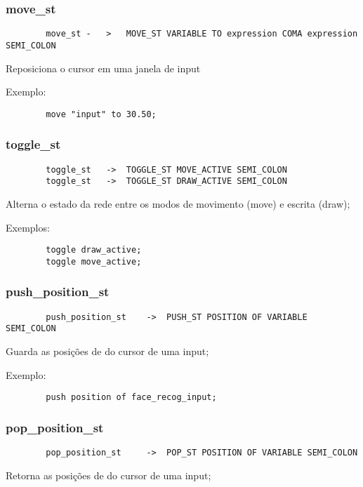 \documentclass[a4paper,10pt]{article}
\begin{document}
	\subsubsection{move\_st}
		\begin{lstlisting}
		move_st	-	>	MOVE_ST VARIABLE TO expression COMA expression SEMI_COLON
		\end{lstlisting}
		Reposiciona o cursor em uma janela de input
		
		Exemplo:
		\begin{lstlisting}
		move "input" to 30.50;
		\end{lstlisting}
		\vspace{10mm}
	\subsubsection{toggle\_st}
		\begin{lstlisting}
		toggle_st	->	TOGGLE_ST MOVE_ACTIVE SEMI_COLON
		toggle_st	->	TOGGLE_ST DRAW_ACTIVE SEMI_COLON
		\end{lstlisting}
		Alterna o estado da rede entre os modos de movimento (move) e escrita (draw);
		
		Exemplos:
		\begin{lstlisting}
		toggle draw_active;
		toggle move_active;
		\end{lstlisting}
		\vspace{10mm}
	\subsubsection{push\_position\_st}
		\begin{lstlisting}
		push_position_st	->	PUSH_ST POSITION OF VARIABLE SEMI_COLON
		\end{lstlisting}
		Guarda as posi\c{c}\~oes de do cursor de uma input;
		
		Exemplo:
		\begin{lstlisting}
		push position of face_recog_input;
		\end{lstlisting}
		\vspace{10mm}
	\subsubsection{pop\_position\_st}
		\begin{lstlisting}
		pop_position_st		->	POP_ST POSITION OF VARIABLE SEMI_COLON
		\end{lstlisting}
		Retorna as posi\c{c}\~oes de do cursor de uma input;
		
\end{document}

